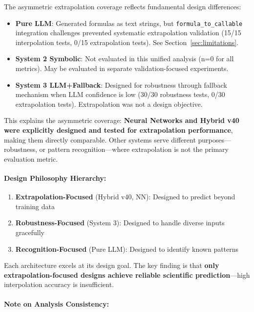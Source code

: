 The asymmetric extrapolation coverage reflects fundamental design differences:

\begin{itemize}
    \item \textbf{Pure LLM}: Generated formulas as text strings, but \texttt{formula\_to\_callable} integration challenges prevented systematic extrapolation validation (15/15 interpolation tests, 0/15 extrapolation tests). See Section~\ref{sec:limitations}.

    \item \textbf{System 2 Symbolic}: Not evaluated in this unified analysis (n=0 for all metrics). May be evaluated in separate validation-focused experiments.

    \item \textbf{System 3 LLM+Fallback}: Designed for robustness through fallback mechanism when LLM confidence is low (30/30 robustness tests, 0/30 extrapolation tests). Extrapolation was not a design objective.
\end{itemize}

This explains the asymmetric coverage: \textbf{Neural Networks and Hybrid v40 were explicitly designed and tested for extrapolation performance}, making them directly comparable. Other systems serve different purposes—robustness, or pattern recognition—where extrapolation is not the primary evaluation metric.

\paragraph{Design Philosophy Hierarchy:}

\begin{enumerate}
    \item \textbf{Extrapolation-Focused} (Hybrid v40, NN): Designed to predict beyond training data
    \item \textbf{Robustness-Focused} (System 3): Designed to handle diverse inputs gracefully
    \item \textbf{Recognition-Focused} (Pure LLM): Designed to identify known patterns
\end{enumerate}

Each architecture excels at its design goal. The key finding is that \textbf{only extrapolation-focused designs achieve reliable scientific prediction}—high interpolation accuracy is insufficient.

\paragraph{Note on Analysis Consistency:}

